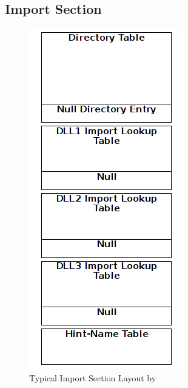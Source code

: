 \subsection*{Import Section}

\begin{figure}
\includegraphics[width=.98\textwidth, height=\textheight,keepaspectratio]{graphics/importsection}
\caption{Typical Import Section Layout by }
\label{fig:import} 
\end{figure}

